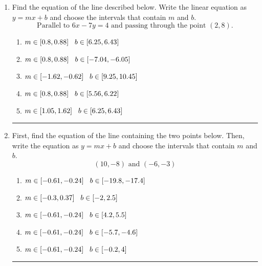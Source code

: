 \documentclass[14pt]{extbook}
\newcommand{\litem}[1]{\item#1\hspace*{-1cm}\rule{\textwidth}{0.4pt}}
\begin{document}
\begin{enumerate}
\litem{
Find the equation of the line described below. Write the linear equation as $ y=mx+b $ and choose the intervals that contain $m$ and $b$.\[ \text{Parallel to } 6 x - 7 y = 4 \text{ and passing through the point } (2, 8). \]\begin{enumerate}[label=\Alph*.]
\item \( m \in [0.8, 0.88] \hspace*{3mm} b \in [6.25, 6.43] \)
\item \( m \in [0.8, 0.88] \hspace*{3mm} b \in [-7.04, -6.05] \)
\item \( m \in [-1.62, -0.62] \hspace*{3mm} b \in [9.25, 10.45] \)
\item \( m \in [0.8, 0.88] \hspace*{3mm} b \in [5.56, 6.22] \)
\item \( m \in [1.05, 1.62] \hspace*{3mm} b \in [6.25, 6.43] \)

\end{enumerate} }
\litem{
First, find the equation of the line containing the two points below. Then, write the equation as $ y=mx+b $ and choose the intervals that contain $m$ and $b$.\[ (10, -8) \text{ and } (-6, -3) \]\begin{enumerate}[label=\Alph*.]
\item \( m \in [-0.61, -0.24] \hspace*{3mm} b \in [-19.8, -17.4] \)
\item \( m \in [-0.3, 0.37] \hspace*{3mm} b \in [-2, 2.5] \)
\item \( m \in [-0.61, -0.24] \hspace*{3mm} b \in [4.2, 5.5] \)
\item \( m \in [-0.61, -0.24] \hspace*{3mm} b \in [-5.7, -4.6] \)
\item \( m \in [-0.61, -0.24] \hspace*{3mm} b \in [-0.2, 4] \)


\end{enumerate}}
\end{enumerate}
\end{document}
